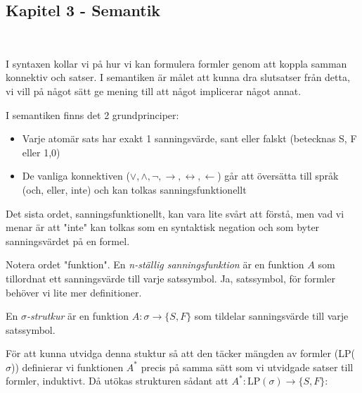 \newpage

\subsection{Kapitel 3 - Semantik}\hfill\\
\par\bigskip
\noindent I syntaxen kollar vi på hur vi kan formulera formler genom att koppla samman konnektiv och satser. I semantiken är målet att kunna dra slutsatser från detta, vi vill på något sätt ge mening till att något implicerar något annat.
\par\bigskip
\noindent I semantiken finns det 2 grundprinciper:
\par\bigskip
\begin{itemize}
  \item Varje atomär sats har exakt 1 sanningsvärde, sant eller falskt (betecknas S, F eller 1,0)
  \item De vanliga konnektiven ($\vee, \wedge, \neg,\rightarrow, \leftrightarrow, \leftarrow$) går att översätta till språk (och, eller, inte) och kan tolkas sanningsfunktionellt
\end{itemize}
\par\bigskip
\noindent Det sista ordet, sanningsfunktionellt, kan vara lite svårt att förstå, men vad vi menar är att "inte" kan tolkas som en syntaktisk negation och som byter sanningsvärdet på en formel. 
\par\bigskip
\noindent Notera ordet "funktion". En \textit{n-ställig sanningsfunktion} är en funktion $A$ som tillordnat ett sanningsvärde till varje satssymbol. Ja, satssymbol, för formler behöver vi lite mer definitioner.
\par\bigskip
\noindent En \textit{$\sigma$-strutkur} är en funktion $A:\sigma\to\{S,F\}$ som tildelar sanningsvärde till varje satssymbol.
\par\bigskip
\noindent För att kunna utvidga denna stuktur så att den täcker mängden av formler (LP($\sigma$)) definierar vi funktionen \textit{$A^*$} precis på samma sätt som vi utvidgade satser till formler, induktivt. Då utökas strukturen sådant att $A^*:\text{LP}(\sigma)\to\{S,F\}$:
\par\bigskip
